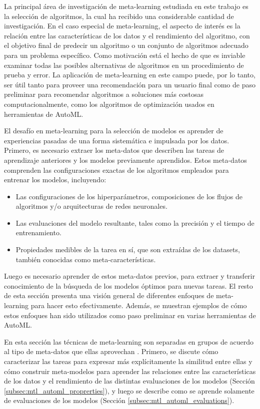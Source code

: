 La principal área de investigación de meta-learning estudiada en este trabajo es la selección de algoritmos, la cual ha recibido una considerable cantidad de investigación. En el caso especial de meta-learning, el aspecto de interés es la relación entre las características de los datos y el rendimiento del algoritmo, con el objetivo final de predecir un algoritmo o un conjunto de algoritmos adecuado para un problema específico. Como motivación está el hecho de que es inviable examinar todas las posibles alternativas de algoritmos en un procedimiento de prueba y error. La aplicación de meta-learning en este campo puede, por lo tanto, ser útil tanto para proveer una recomendación para un usuario final como de paso preliminar para recomendar algoritmos a soluciones más costosas computacionalmente, como los algoritmos de optimización usados en herramientas de AutoML. 


El desafío en meta-learning para la selección de modelos es aprender de experiencias pasadas de una forma sistemática e impulsada por los datos. Primero, es necesario extraer los meta-datos que describen las tareas de aprendizaje anteriores y los modelos previamente aprendidos. Estos meta-datos comprenden las configuraciones exactas de los algoritmos empleados para entrenar los modelos, incluyendo:

\begin{itemize}
	\item Las configuraciones de los hiperparámetros, composiciones de los flujos de algoritmos y/o arquitecturas de redes neuronales.
	\item Las evaluaciones del modelo resultante, tales como la precisión y el tiempo de entrenamiento.
	\item Propiedades medibles de la tarea en sí, que son extraídas de los datasets, también conocidas como meta-características.
\end{itemize}

Luego es necesario aprender de estos meta-datos previos, para extraer y transferir conocimiento de la búsqueda de los modelos óptimos para nuevas tareas. El resto de esta sección presenta una visión general de diferentes enfoques de meta-learning para hacer esto efectivamente. Además, se muestran ejemplos de cómo estos enfoques han sido utilizados como paso preliminar en varias herramientas de AutoML.

En esta sección las técnicas de meta-learning son separadas en grupos de acuerdo al tipo de meta-datos que ellas aprovechan \cite{vanschoren2018metalearning}. Primero, se discute cómo caracterizar las tareas para expresar más explícitamente la similitud entre ellas y cómo construir meta-modelos para aprender las relaciones entre las características de los datos y el rendimiento de las distintas evaluaciones de los modelos (Sección \ref{subsec:mtl_automl_proprerties}), y luego se describe como se aprende solamente de evaluaciones de los modelos (Sección \ref{subsec:mtl_automl_evaluations}).

